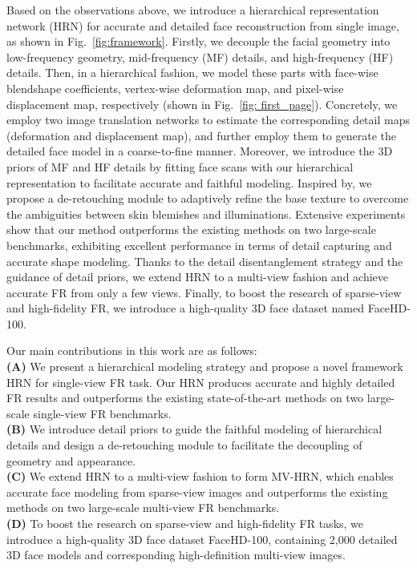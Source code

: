 \documentclass[10pt,twocolumn,letterpaper]{article}
\begin{document}
Based on the observations above, we introduce a hierarchical representation network (HRN) for accurate and detailed face reconstruction from single image, as shown in Fig.~\ref{fig:framework}.
Firstly, we decouple the facial geometry into low-frequency geometry, mid-frequency (MF) details, and high-frequency (HF) details. Then, in a hierarchical fashion, we model these parts with face-wise blendshape coefficients, vertex-wise deformation map, and pixel-wise displacement map, respectively (shown in Fig.~\ref{fig: first_page}). Concretely, we employ two image translation networks\cite{2016Image} to estimate the corresponding detail maps (deformation and displacement map), and further employ them to generate the detailed face model in a coarse-to-fine manner. Moreover, we introduce the 3D priors of MF and HF details by fitting face scans with our hierarchical representation to facilitate accurate and faithful modeling. Inspired by\cite{lei2022abpn}, we propose a de-retouching module to adaptively refine the base texture to overcome the ambiguities between skin blemishes and illuminations. Extensive experiments show that our method outperforms the existing methods on two large-scale benchmarks, exhibiting excellent performance in terms of detail capturing and accurate shape modeling. Thanks to the detail disentanglement strategy and the guidance of detail priors, we extend HRN to a multi-view fashion and achieve accurate FR from only a few views.
Finally, to boost the research of sparse-view and high-fidelity FR, we introduce a high-quality 3D face dataset named FaceHD-100.

Our main contributions in this work are as follows: \\
\textbf{(A)} We present a hierarchical modeling strategy and propose a novel framework HRN for single-view FR task. Our HRN produces accurate and highly detailed FR results and outperforms the existing state-of-the-art methods on two large-scale single-view FR benchmarks. \\
\textbf{(B)} We introduce detail priors to guide the faithful modeling of hierarchical details and design a de-retouching module to facilitate the decoupling of geometry and appearance. \\
\textbf{(C)} We extend HRN to a multi-view fashion to form MV-HRN, which enables accurate face modeling from sparse-view images and outperforms the existing methods on two large-scale multi-view FR benchmarks. \\
\textbf{(D)} To boost the research on sparse-view and high-fidelity FR tasks, we introduce a high-quality 3D face dataset FaceHD-100, containing 2,000 detailed 3D face models and corresponding high-definition multi-view images.
\end{document}
